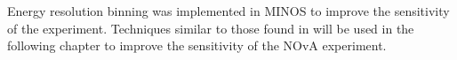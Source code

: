 
Energy resolution binning was implemented in MINOS to improve the sensitivity of the experiment. Techniques similar to those found in \cite{Marshall} will be used in the following chapter to improve the sensitivity of the NOvA experiment.
